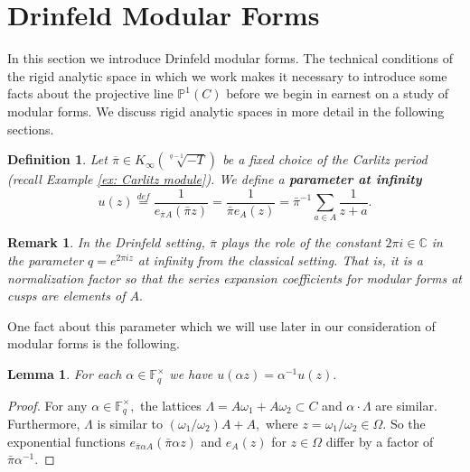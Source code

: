 \documentclass[11pt]{amsart}
\newtheorem{lemma}[theorem]{Lemma}
\newtheorem{definition}[theorem]{Definition}
\newtheorem{remark}[theorem]{Remark}
\theoremstyle{definition}
\numberwithin{equation}{section}
\newcommand{\bbC}{\mathbb{C}}		%
\newcommand{\bbF}{\mathbb{F}}		%
\newcommand{\bbP}{\mathbb{P}}		%
\begin{document}
		
		\section{Drinfeld Modular Forms}
		
		In this section we introduce Drinfeld modular forms. The technical conditions of the rigid analytic space in which we work makes it necessary to introduce some facts about the projective line $\bbP^1(C)$ before we begin in earnest on a study of modular forms. We discuss rigid analytic spaces in more detail in the following sections.
		
		\begin{definition}\label{d: parameter at infty}
			Let $\overline{\pi}\in K_{\infty}(\sqrt[q-1]{-T})$ be a fixed choice of the Carlitz period (recall Example \ref{ex: Carlitz module}). We define a \textbf{parameter at infinity} 
			\[u(z)\overset{def}{=}\frac{1}{e_{\overline{\pi}A}(\bar{\pi}z)}=\frac{1}{\bar{\pi}e_A(z)}=\bar{\pi}^{-1}\sum_{a\in A}\frac{1}{z+a}.\]
		\end{definition}
		\begin{remark}
			In the Drinfeld setting, $\overline{\pi}$ plays the role of the constant $2\pi i\in \bbC$ in the parameter $q=e^{2\pi i z}$ at infinity from the classical setting. That is, it is a normalization  factor so that the series expansion coefficients for modular forms at cusps are elements of $A.$ 
		\end{remark}
		
		One fact about this parameter which we will use later in our consideration of modular forms is the following. 
		\begin{lemma}\cite[Page $10$]{Gekeler-survey-Drinfeld-modular-forms}\label{l: u(a/d)=d/au}
			For each $\alpha\in \bbF_q^{\times}$ we have $\displaystyle{u\left(\alpha z\right)=\alpha^{-1}u(z)}.$
		\end{lemma}	
		\begin{proof}
			For any $\alpha \in \bbF_q^{\times},$ the lattices $\Lambda = A\omega_1+A\omega_2\subset C$ and $\alpha\cdot \Lambda$ are similar. Furthermore, $\Lambda$ is similar to $(\omega_1/\omega_2)A+A,$ where $z=\omega_1/\omega_2\in \Omega.$ So the exponential functions $e_{\bar{\pi}\alpha A}(\bar{\pi}\alpha z)$ and $e_A(z)$ for $z\in \Omega$ differ by a factor of $\bar{\pi}\alpha^{-1}.$
		\end{proof}
		
\end{document}
